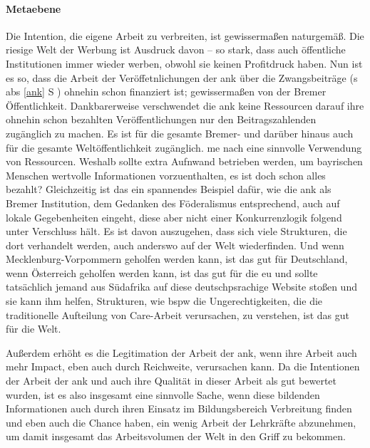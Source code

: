 \paragraph{Metaebene}
Die Intention, die eigene Arbeit zu verbreiten, ist gewissermaßen naturgemäß. Die riesige Welt der Werbung ist Ausdruck davon -- so stark, dass auch öffentliche Institutionen immer wieder werben, obwohl sie keinen Profitdruck haben. 
Nun ist es so, dass die Arbeit der Veröffetnlichungen der \gls{ank} über die Zwangsbeiträge (\gls{s} \gls{abs} \ref{ank} \gls{S} \pageref{ank}) ohnehin schon finanziert ist; gewissermaßen von der Bremer Öffentlichkeit. Dankbarerweise verschwendet die \gls{ank} keine Ressourcen darauf ihre ohnehin schon bezahlten Veröffentlichungen nur den Beitragszahlenden zugänglich zu machen. Es ist für die gesamte Bremer- und darüber hinaus auch für die gesamte Weltöffentlichkeit zugänglich. \Gls{me} nach eine sinnvolle Verwendung von Ressourcen. Weshalb sollte extra Aufnwand betrieben werden, um bayrischen Menschen wertvolle Informationen vorzuenthalten, es ist doch schon alles bezahlt? 
Gleichzeitig ist das ein spannendes Beispiel dafür, wie die \gls{ank} als Bremer Institution, dem Gedanken des Föderalismus entsprechend, auch auf lokale Gegebenheiten eingeht, diese aber nicht einer Konkurrenzlogik folgend unter Verschluss hält. Es ist davon auszugehen, dass sich viele Strukturen, die dort verhandelt werden, auch anderswo auf der Welt wiederfinden. Und wenn Mecklenburg-Vorpommern geholfen werden kann, ist das gut für Deutschland, wenn Österreich geholfen werden kann, ist das gut für die \gls{eu} und sollte tatsächlich jemand aus Südafrika auf diese deutschpsrachige Website stoßen und sie kann ihm helfen, Strukturen, wie \gls{bspw} die Ungerechtigkeiten, die die traditionelle Aufteilung von Care-Arbeit verursachen, zu verstehen, ist das gut für die Welt. 

Außerdem erhöht es die Legitimation der Arbeit der \gls{ank}, wenn ihre Arbeit auch mehr Impact, eben auch durch Reichweite, verursachen kann. Da die Intentionen der Arbeit der \gls{ank} und auch ihre Qualität in dieser Arbeit als gut bewertet wurden, ist es also insgesamt eine sinnvolle Sache, wenn diese bildenden Informationen auch durch ihren Einsatz im Bildungsbereich Verbreitung finden und eben auch die Chance haben, ein wenig Arbeit der Lehrkräfte abzunehmen, um damit insgesamt das Arbeitsvolumen der Welt in den Griff zu bekommen. 


